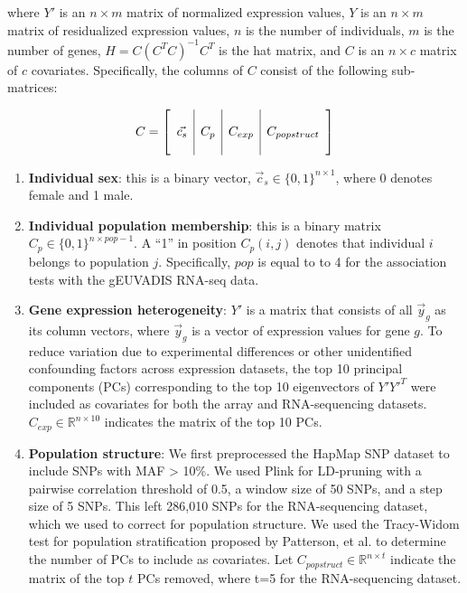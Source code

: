 where $Y'$ is an $n \times m$ matrix of normalized expression values,
$Y$ is an $n \times m$ matrix of residualized expression values, $n$ is
the number of individuals, $m$ is the number of genes,
$H=C(C^TC)^{-1}C^T$ is the hat matrix, and $C$ is an $n \times c$ matrix
of $c$ covariates. Specifically, the columns of $C$ consist of the
following sub-matrices:

\begin{equation}
C = \left[\begin{array}{c | c | c | c}
&&& \\
\vec{c_s} & C_p & C_{exp} & C_{popstruct} \\ 
&&& \\
\end{array}\right]
\end{equation}
   
\begin{enumerate}
\item
  \textbf{Individual sex}: this is a binary vector,
  $\vec{c}_s \in \{0,1\}^{n\times 1}$, where 0 denotes female and 1
  male.
\item
  \textbf{Individual population membership}: this is a binary matrix
  $C_{p} \in \{0,1\}^{n\times pop-1}$. A
  ``1'' in position $C_{p}(i,j)$ denotes that individual $i$ belongs to
  population $j$. Specifically, $pop$ is equal to to 4 for the association
  tests with the gEUVADIS RNA-seq data.
\item
  \textbf{Gene expression heterogeneity}: $Y'$ is a matrix that
  consists of all $\vec{y}_g$ as its column vectors, where $\vec{y}_g$ is a vector of expression values for gene $g$. To reduce variation
  due to experimental differences or other unidentified confounding
  factors across expression datasets, the top 10 principal components
  (PCs) corresponding to the top 10 eigenvectors of $Y'Y'^T$ were included
  as covariates for both the array and RNA-sequencing datasets.
  $C_{exp} \in \mathbb{R}^{n\times 10}$ indicates the matrix of the top
  10 PCs.
\item
  \textbf{Population structure}: We first preprocessed the HapMap SNP
  dataset to include SNPs with MAF \textgreater{} 10\%. We used Plink
  \cite{PurcellNealeTodd-BrownEtAl2007} for LD-pruning with a pairwise correlation threshold of
  0.5, a window size of 50 SNPs, and a step size of 5 SNPs. This left
  286,010 SNPs for the RNA-sequencing dataset, which we used to correct for population structure. We
  used the Tracy-Widom test for population stratification proposed by
  Patterson, et al. \cite{PattersonPriceReich2006} to determine the number of PCs to
  include as covariates. Let $C_{popstruct}\in \mathbb{R}^{n\times t}$
  indicate the matrix of the top $t$ PCs removed, where t=5 for the
  RNA-sequencing dataset.
\end{enumerate}

